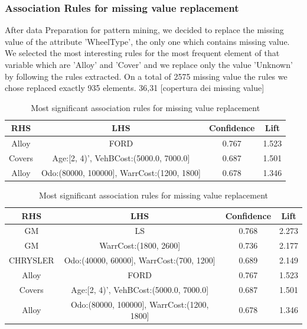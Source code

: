 \documentclass{article}
\begin{document}
	\subsubsection{Association Rules for missing value replacement}
	
	After data Preparation for pattern mining, we decided to replace the missing value of the attribute 'WheelType', the only one which contains missing value.\\
	We selected the most interesting rules for the most frequent element of that variable which are  'Alloy' and 'Cover' and we replace only the value 'Unknown' by following the rules extracted. 
	On a total of 2575 missing value the rules we chose replaced exactly 935 elements.
	36,31 [copertura dei missing value]
	
	
	\begin{table}[H]
		\centering
		\begin{tabular}{|cc|cc|}
			\hline
			\textbf{RHS} & \textbf{LHS} & \textbf{Confidence} & \textbf{Lift} \\
			\hline
			\rowcolor{Gray}
			Alloy & FORD  & 0.767 & 1.523\\
			Covers & Age:[2, 4)', VehBCost:(5000.0, 7000.0]  & 0.687 & 1.501 \\
			\rowcolor{Gray}
			Alloy &  Odo:(80000, 100000], WarrCost:(1200, 1800] &  0.678 & 1.346 \\
			\hline
		\end{tabular}
		\caption{Most significant association rules for missing value replacement}
	\end{table}
	
	
	
	
	\begin{table}[H]
		\centering
		\begin{tabular}{|cc|cc|}
			\hline
			\textbf{RHS} & \textbf{LHS} & \textbf{Confidence} & \textbf{Lift} \\
			\hline
			\rowcolor{Gray}
			GM & LS & 0.768 & 2.273\\
			GM & WarrCost:(1800, 2600] & 0.736 & 2.177\\
			\rowcolor{Gray}
			CHRYSLER & Odo:(40000, 60000], WarrCost:(700, 1200] & 0.689 & 2.149\\
			Alloy & FORD  & 0.767 & 1.523\\
			\rowcolor{Gray}
			Covers & Age:[2, 4)', VehBCost:(5000.0, 7000.0]  & 0.687 & 1.501 \\
			Alloy &  Odo:(80000, 100000], WarrCost:(1200, 1800] &  0.678 & 1.346 \\
			\hline
		\end{tabular}
		\caption{Most significant association rules for missing value replacement}
	\end{table}
	
\end{document}
